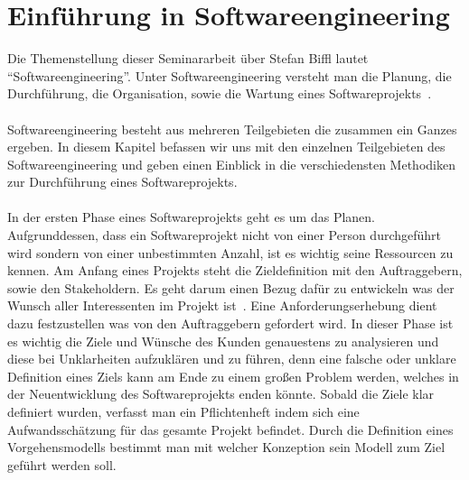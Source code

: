 \documentclass{llncs}
\begin{document}
\tableofcontents
\newpage


\section{Einführung in Softwareengineering}

Die Themenstellung dieser Seminararbeit über Stefan Biffl lautet “Softwareengineering”. Unter Softwareengineering versteht man die Planung, die Durchführung, die Organisation, sowie die Wartung eines Softwareprojekts~\cite{book:SEChapter8}. 
\\ \\
Softwareengineering besteht aus mehreren Teilgebieten die zusammen ein Ganzes ergeben. In diesem Kapitel befassen wir uns mit den einzelnen Teilgebieten des Softwareengineering und geben einen Einblick in die verschiedensten Methodiken zur Durchführung eines Softwareprojekts.
\\ \\
In der ersten Phase eines Softwareprojekts geht es um das Planen. Aufgrunddessen, dass ein Softwareprojekt nicht von einer Person durchgeführt wird sondern von einer unbestimmten Anzahl, ist es wichtig seine Ressourcen zu kennen. Am Anfang eines Projekts steht die Zieldefinition mit den Auftraggebern, sowie den Stakeholdern. Es geht darum einen Bezug dafür zu entwickeln was der Wunsch aller Interessenten im Projekt ist~\cite{book:SEChapter10}. Eine Anforderungserhebung dient dazu festzustellen was von den Auftraggebern gefordert wird. In dieser Phase ist es wichtig die Ziele und Wünsche des Kunden genauestens zu analysieren und diese bei Unklarheiten aufzuklären und zu führen, denn eine falsche oder unklare Definition eines Ziels kann am Ende zu einem großen Problem werden, welches in der Neuentwicklung des Softwareprojekts enden könnte. Sobald die Ziele klar definiert wurden, verfasst man ein Pflichtenheft indem sich eine Aufwandsschätzung für das gesamte Projekt befindet. Durch die Definition eines Vorgehensmodells bestimmt man mit welcher Konzeption sein Modell zum Ziel geführt werden soll.
\\ \\
\end{document}
